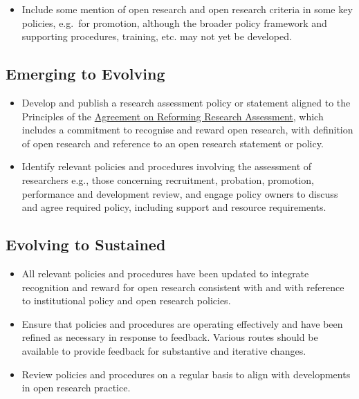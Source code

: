 \documentclass[
  letterpaper,
  DIV=11,
  numbers=noendperiod,
  oneside]{scrreprt}
\providecommand{\tightlist}{%
  \setlength{\itemsep}{0pt}\setlength{\parskip}{0pt}}\usepackage{longtable,booktabs,array}
\begin{document}
\begin{itemize}
\tightlist
\item
  Include some mention of open research and open research criteria in
  some key policies, e.g.~for promotion, although the broader policy
  framework and supporting procedures, training, etc. may not yet be
  developed.
\end{itemize}

\subsection{Emerging to Evolving}\label{emerging-to-evolving-4}

\begin{itemize}
\item
  Develop and publish a research assessment policy or statement aligned
  to the Principles of the
  \href{https://coara.eu/agreement/the-agreement-full-text/}{Agreement
  on Reforming Research Assessment}, which includes a commitment to
  recognise and reward open research, with definition of open research
  and reference to an open research statement or policy.
\item
  Identify relevant policies and procedures involving the assessment of
  researchers e.g., those concerning recruitment, probation, promotion,
  performance and development review, and engage policy owners to
  discuss and agree required policy, including support and resource
  requirements.
\end{itemize}

\subsection{Evolving to Sustained}\label{evolving-to-sustained-4}

\begin{itemize}
\item
  All relevant policies and procedures have been updated to integrate
  recognition and reward for open research consistent with and with
  reference to institutional policy and open research policies.
\item
  Ensure that policies and procedures are operating effectively and have
  been refined as necessary in response to feedback. Various routes
  should be available to provide feedback for substantive and iterative
  changes.
\item
  Review policies and procedures on a regular basis to align with
  developments in open research practice.
\end{itemize}
\end{document}
